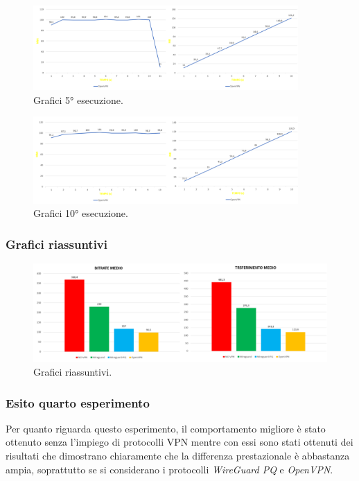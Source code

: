 \begin{figure}[h] \includegraphics[width=0.9\textwidth] {Tesi magistrale/capitoli/images/50.png}
\centering
\caption{Grafici 5° esecuzione.}
\end{figure}

\begin{figure}[h] \includegraphics[width=0.9\textwidth] {Tesi magistrale/capitoli/images/51.png}
\centering
\caption{Grafici 10° esecuzione.}
\end{figure}

\newpage
\subsubsection{Grafici riassuntivi}

\begin{figure}[h] \includegraphics[width=1\textwidth] {Tesi magistrale/capitoli/images/52.png}
\centering
\caption{Grafici riassuntivi.}
\end{figure}

\subsubsection{Esito quarto esperimento}
Per quanto riguarda questo esperimento, il comportamento migliore è stato ottenuto senza l'impiego di protocolli VPN mentre con essi sono stati ottenuti dei risultati che dimostrano chiaramente che la differenza prestazionale è abbastanza ampia, soprattutto se si considerano i protocolli \emph{WireGuard PQ} e \emph{OpenVPN}.

